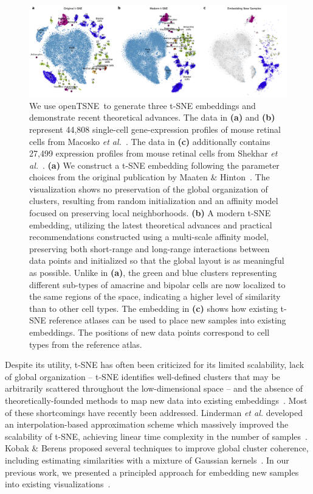 \documentclass[twocolumn]{bmcart}
\newcommand{\opentsne}{\textsf{openTSNE}}
\begin{document}
\begin{figure}[htbp]
  \includegraphics[width=\textwidth]{macosko2015}
  \caption{\label{fig:macosko}
  We use \opentsne\ to generate three t-SNE embeddings and demonstrate recent
  theoretical advances. The data in \textbf{(a)} and \textbf{(b)} represent 44,808
  single-cell gene-expression profiles of mouse retinal cells from Macosko
  \textit{et al.}~\cite{macosko2015highly}. The data in \textbf{(c)}
  additionally contains 27,499 expression profiles from mouse
  retinal cells from Shekhar \textit{et al.}~\cite{shekhar2016comprehensive}.
  \textbf{(a)} We construct a t-SNE
  embedding following the parameter choices from the original publication
  by Maaten \& Hinton~\cite{maaten2008visualizing}. The visualization
  shows no preservation of the global organization of clusters,
  resulting from random initialization and an affinity model focused on
  preserving local neighborhoods. \textbf{(b)} A modern t-SNE
  embedding, utilizing the latest theoretical advances and practical
  recommendations constructed using a multi-scale
  affinity model, preserving both short-range and long-range interactions
  between data points and initialized so that the global layout is
  as meaningful as possible. Unlike in \textbf{(a)}, the green and blue clusters
  representing different sub-types of amacrine and bipolar cells are now
  localized to the same regions of the space, indicating a higher level
  of similarity than to other cell types. The embedding in \textbf{(c)} shows how existing
  t-SNE reference atlases can be used to place new samples into existing
  embeddings. The positions of new data points correspond to cell types
  from the reference atlas.
}
\end{figure}

Despite its utility, t-SNE has often been criticized for its limited
scalability, lack of global organization -- t-SNE identifies well-defined clusters that
may be arbitrarily scattered throughout the low-dimensional space -- and the absence of
theoretically-founded methods to map new data into existing
embeddings~\cite{ding2018interpretable,becht2019dimensionality}. Most of these
shortcomings have recently been addressed. Linderman \textit{et al.} developed
an interpolation-based approximation scheme which massively improved the
scalability of t-SNE, achieving linear time complexity
in the number of samples~\cite{linderman2019fast}. Kobak \& Berens proposed
several techniques to improve global cluster coherence, including estimating
similarities with a mixture of Gaussian kernels~\cite{kobak2019art}. In our
previous work, we presented a principled approach for embedding new samples into
existing visualizations~\cite{policar2019embedding}.
\end{document}

